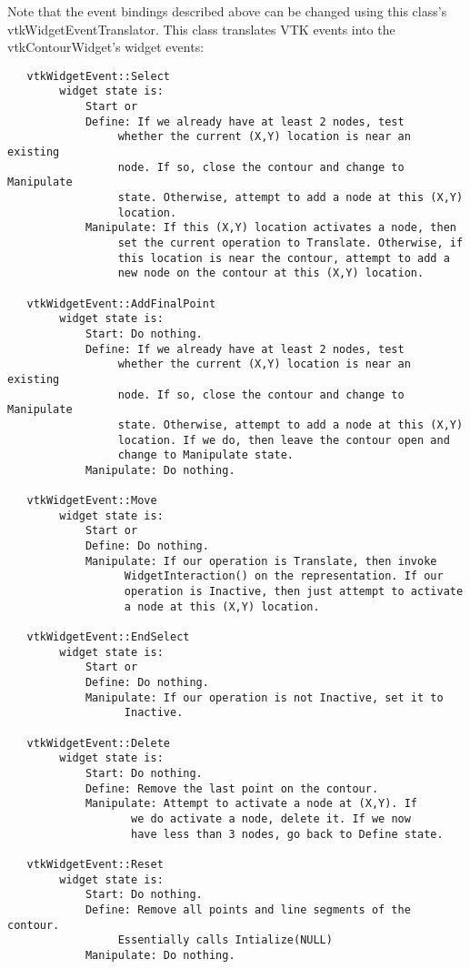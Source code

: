  Note that the event bindings described above can be changed using this
 class's vtkWidgetEventTranslator. This class translates VTK events 
 into the vtkContourWidget's widget events:
 \begin{verbatim}
   vtkWidgetEvent::Select 
        widget state is: 
            Start or
            Define: If we already have at least 2 nodes, test
                 whether the current (X,Y) location is near an existing
                 node. If so, close the contour and change to Manipulate
                 state. Otherwise, attempt to add a node at this (X,Y)
                 location.
            Manipulate: If this (X,Y) location activates a node, then
                 set the current operation to Translate. Otherwise, if
                 this location is near the contour, attempt to add a 
                 new node on the contour at this (X,Y) location.

   vtkWidgetEvent::AddFinalPoint
        widget state is: 
            Start: Do nothing.
            Define: If we already have at least 2 nodes, test
                 whether the current (X,Y) location is near an existing
                 node. If so, close the contour and change to Manipulate
                 state. Otherwise, attempt to add a node at this (X,Y)
                 location. If we do, then leave the contour open and
                 change to Manipulate state.
            Manipulate: Do nothing.

   vtkWidgetEvent::Move
        widget state is: 
            Start or
            Define: Do nothing.
            Manipulate: If our operation is Translate, then invoke
                  WidgetInteraction() on the representation. If our 
                  operation is Inactive, then just attempt to activate
                  a node at this (X,Y) location.

   vtkWidgetEvent::EndSelect
        widget state is: 
            Start or
            Define: Do nothing.
            Manipulate: If our operation is not Inactive, set it to
                  Inactive.

   vtkWidgetEvent::Delete
        widget state is: 
            Start: Do nothing.
            Define: Remove the last point on the contour.
            Manipulate: Attempt to activate a node at (X,Y). If
                   we do activate a node, delete it. If we now
                   have less than 3 nodes, go back to Define state.

   vtkWidgetEvent::Reset
        widget state is: 
            Start: Do nothing.
            Define: Remove all points and line segments of the contour.
                 Essentially calls Intialize(NULL) 
            Manipulate: Do nothing.
 \end{verbatim}

